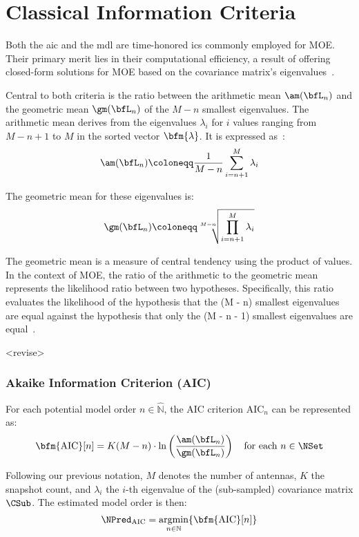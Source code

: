 \section{Classical Information Criteria}
Both the \gls{aic} and the \gls{mdl} are time-honored \glspl{ic} commonly employed for MOE.
Their primary merit lies in their computational efficiency, a result of offering closed-form solutions for MOE based on the covariance matrix's eigenvalues~\cite{barthelme2020}.

Central to both criteria is the ratio between the arithmetic mean \( \am(\bfL_n) \) and the geometric mean \( \gm(\bfL_n) \) of the \( M - n \) smallest eigenvalues. The arithmetic mean derives from the eigenvalues \( \lambda_i \) for \( i \) values ranging from \( M-n+1 \) to \( M \) in the sorted vector \( \bfm{\lambda} \). It is expressed as~\cite{trees.ch7}:
\begin{equation}
    \am(\bfL_n) \coloneqq \frac{1}{M-n} \sum_{i=n+1}^{M} \lambda_i
\end{equation}

The geometric mean for these eigenvalues is:
\begin{equation}
    \gm(\bfL_n) \coloneqq \sqrt[M-n]{\prod_{i=n+1}^{M} \lambda_i}
\end{equation}

The geometric mean is a measure of central tendency using the product of values. In the context of MOE, the ratio of the arithmetic to the geometric mean represents the likelihood ratio between two hypotheses. Specifically, this ratio evaluates the likelihood of the hypothesis that the (M - n) smallest eigenvalues are equal against the hypothesis that only the (M - n - 1) smallest eigenvalues are equal~\cite{trees.ch7}.

<revise>
\subsubsection{Akaike Information Criterion (AIC)}

For each potential model order \(n \in \widehat{\mathbb{N}} \), the AIC criterion \( \mathrm{AIC}_n \) can be represented as:
\begin{equation}
    \bfm{\mathrm{AIC}}[n] = K (M-n) \cdot \ln \left(\frac{\am(\bfL_n)}{\gm(\bfL_n)}\right) \quad \text{for each } n \in \NSet
    \label{eq:AIC}
\end{equation}

Following our previous notation, \( M \) denotes the number of antennas, \( K \) the snapshot count, and \( \lambda_i \) the \( i \)-th eigenvalue of the (sub-sampled) covariance matrix \( \CSub \). The estimated model order is then:
\begin{equation}
    \NPred_\mathrm{AIC}=\underset{n \in \mathbb{N}}{\operatorname{argmin}}\{ \bfm{\mathrm{AIC}}[n] \}
    \label{eq:AIC_argmin}
\end{equation}

